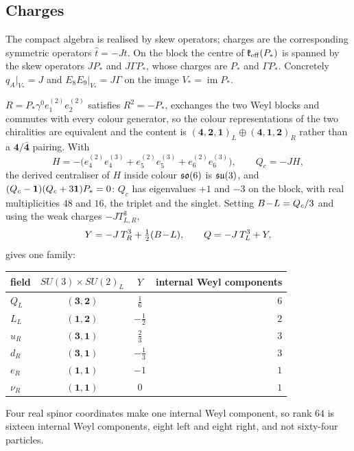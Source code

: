 \subsection{Charges}

The compact algebra is realised by skew operators; charges are the corresponding symmetric operators $\hat t=-Jt$. On the block the
centre of $\mathfrak k_{\rm eff}(P_*)$ is spanned by the skew operators $JP_*$ and $J\Gamma P_*$, whose charges are $P_*$ and $\Gamma P_*$. Concretely
$q_A|_{V_*}=J$ and $E_8E_9|_{V_*}=J\Gamma$ on the image $V_*=\operatorname{im}P_*$.

\begin{proposition}
\label{prop:PSledger}
$R=P_*\gamma^0e^{(2)}_1e^{(2)}_2$ satisfies $R^2=-P_*$, exchanges the two Weyl blocks and commutes with every colour generator, so the
colour representations of the two chiralities are equivalent and the content is $(\mathbf4,\mathbf2,\mathbf1)_L\oplus(\mathbf4,\mathbf1,
\mathbf2)_R$ rather than a $\mathbf4/\bar{\mathbf4}$ pairing. With
\[
H=-\bigl(e^{(2)}_4e^{(3)}_4+e^{(2)}_5e^{(3)}_5+e^{(2)}_6e^{(3)}_6\bigr),\qquad Q_c=-JH,
\]
the derived centraliser of $H$ inside colour $\mathfrak{so}(6)$ is $\mathfrak{su}(3)$, and $(Q_c-\mathbf 1)(Q_c+3\mathbf 1)P_*=0$: $Q_c$ has eigenvalues $+1$ and $-3$ on
the block, with real multiplicities $48$ and $16$, the triplet and the singlet. Setting $B\!-\!L=Q_c/3$ and using the weak charges
$-JT^3_{L,R}$,
\[
Y=-J\,T^3_R+\tfrac12(B\!-\!L),\qquad Q=-J\,T^3_L+Y ,
\]
gives one family:
\begin{center}
\begin{tabular}{@{}lccr@{}}
\toprule
field & $SU(3)\times SU(2)_L$ & $Y$ & internal Weyl components\\
\midrule
$Q_L$ & $(\mathbf3,\mathbf2)$ & $\tfrac16$ & $6$\\
$L_L$ & $(\mathbf1,\mathbf2)$ & $-\tfrac12$ & $2$\\
$u_R$ & $(\mathbf3,\mathbf1)$ & $\tfrac23$ & $3$\\
$d_R$ & $(\mathbf3,\mathbf1)$ & $-\tfrac13$ & $3$\\
$e_R$ & $(\mathbf1,\mathbf1)$ & $-1$ & $1$\\
$\nu_R$ & $(\mathbf1,\mathbf1)$ & $0$ & $1$\\
\bottomrule
\end{tabular}
\end{center}
Four real spinor coordinates make one internal Weyl component, so rank $64$ is sixteen internal Weyl components, eight left and eight
right, and not sixty-four particles.
\end{proposition}

